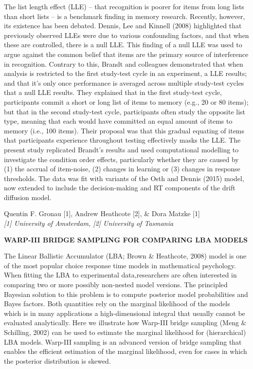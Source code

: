\documentclass[]{article}
\begin{document}
The list length effect (LLE) -- that recognition is poorer for items
from long lists than short lists -- is a benchmark finding in memory
research. Recently, however, its existence has been debated. Dennis, Lee
and Kinnell (2008) highlighted that previously observed LLEs were due to
various confounding factors, and that when these are controlled, there
is a null LLE. This finding of a null LLE was used to argue against the
common belief that items are the primary source of interference in
recognition. Contrary to this, Brandt and colleagues demonstrated that
when analysis is restricted to the first study-test cycle in an
experiment, a LLE results; and that it's only once performance is
averaged across multiple study-test cycles that a null LLE results. They
explained that in the first study-test cycle, participants commit a
short or long list of items to memory (e.g., 20 or 80 items); but that
in the second study-test cycle, participants often study the opposite
list type, meaning that each would have committed an equal amount of
items to memory (i.e., 100 items). Their proposal was that this gradual
equating of items that participants experience throughout testing
effectively masks the LLE. The present study replicated Brandt's results
and used computational modelling to investigate the condition order
effects, particularly whether they are caused by (1) the accrual of
item-noise, (2) changes in learning or (3) changes in response
thresholds. The data was fit with variants of the Osth and Dennis (2015)
model, now extended to include the decision-making and RT components of
the drift diffusion model.\\
\pagebreak  

Quentin F. Gronau {[}1{]}, Andrew Heathcote {[}2{]}, \& Dora Matzke
{[}1{]}\\
\emph{{[}1{]} University of Amsterdam, {[}2{]} University of Tasmania}

\textbf{WARP-III BRIDGE SAMPLING FOR COMPARING LBA MODELS}

The Linear Ballistic Accumulator (LBA; Brown \& Heathcote, 2008) model
is one of the most popular choice response time models in mathematical
psychology. When fitting the LBA to experimental data,researchers are
often interested in comparing two or more possibly non-nested model
versions. The principled Bayesian solution to this problem is to compute
posterior model probabilities and Bayes factors. Both quantities rely on
the marginal likelihood of the models which is in many applications a
high-dimensional integral that usually cannot be evaluated analytically.
Here we illustrate how Warp-III bridge sampling (Meng \& Schilling,
2002) can be used to estimate the marginal likelihood for (hierarchical)
LBA models. Warp-III sampling is an advanced version of bridge sampling
that enables the efficient estimation of the marginal likelihood, even
for cases in which the posterior distribution is skewed.\\
\pagebreak  
\end{document}
